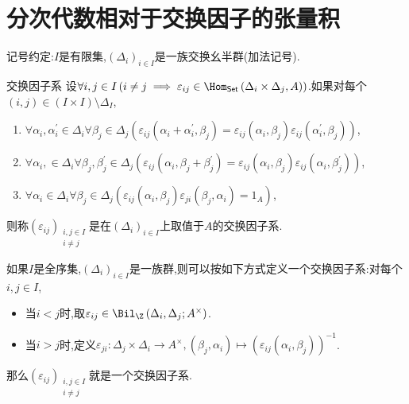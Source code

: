 \section{分次代数相对于交换因子的张量积}

记号约定:$I$是有限集,$\left(\Delta_{i}\right)_{i\in I}$是一族交换幺半群(加法记号).

\begin{definition}{交换因子系}{}
	设$\forall i,j\in I\left(i\neq j\implies\varepsilon_{ij}\in\Hom_{\mathsf{Set}}\left(\Delta_{i}\times\Delta_{j},A\right)\right)$.如果对每个$\left(i,j\right)\in \left(I\times I\right)\setminus\Delta_{I}$,
	\begin{enumerate}
		\item $\forall\alpha_{i},\alpha_{i}^{\prime}\in\Delta_{i}\forall\beta_{j}\in\Delta_{j}\left(\varepsilon_{ij}\left(\alpha_{i}+\alpha_{i}^{\prime},\beta_{j}\right)=\varepsilon_{ij}\left(\alpha_{i},\beta_{j}\right)\varepsilon_{ij}\left(\alpha_{i}^{\prime},\beta_{j}\right)\right)$,
		\item $\forall\alpha_{i},\in\Delta_{i}\forall\beta_{j},\beta_{j}^{\prime}\in\Delta_{j}\left(\varepsilon_{ij}\left(\alpha_{i},\beta_{j}+\beta_{j}^{\prime}\right)=\varepsilon_{ij}\left(\alpha_{i},\beta_{j}\right)\varepsilon_{ij}\left(\alpha_{i},\beta_{j}^{\prime}\right)\right)$,
		\item $\forall\alpha_{i}\in\Delta_{i}\forall\beta_{j}\in\Delta_{j}\left(\varepsilon_{ij}\left(\alpha_{i},\beta_{j}\right)\varepsilon_{ji}\left(\beta_{j},\alpha_{i}\right)=1_{A}\right)$,
	\end{enumerate}
	则称$\left(\varepsilon_{ij}\right)_{\substack{i,j\in I\\i\neq j}}$是在$\left(\Delta_{i}\right)_{i\in I}$上取值于$A$的交换因子系.
\end{definition}

\begin{remark}{}{}
	如果$I$是全序集,$\left(\Delta_{i}\right)_{i\in I}$是一族群,则可以按如下方式定义一个交换因子系:对每个$i,j\in I$,
	\begin{itemize}
		\item 当$i<j$时,取$\varepsilon_{ij}\in\Bil_{\Z}\left(\Delta_{i},\Delta_{j};A^{\times}\right)$.
		\item 当$i>j$时,定义$\varepsilon_{ji}:\Delta_{j}\times\Delta_{i}\to A^{\times},\left(\beta_{j},\alpha_{i}\right)\mapsto\left(\varepsilon_{ij}\left(\alpha_{i},\beta_{j}\right)\right)^{-1}$.
	\end{itemize}
	那么$\left(\varepsilon_{ij}\right)_{\substack{i,j\in I\\i\neq j}}$就是一个交换因子系.
\end{remark}

